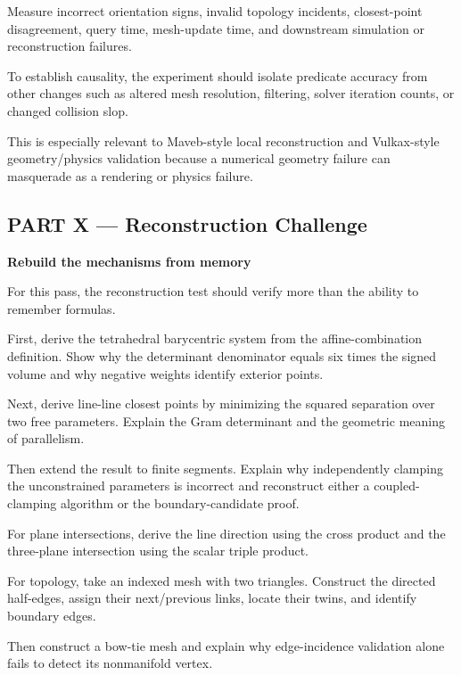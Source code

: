 Measure incorrect orientation signs, invalid topology incidents, closest-point disagreement, query time, mesh-update time, and downstream simulation or reconstruction failures.

To establish causality, the experiment should isolate predicate accuracy from other changes such as altered mesh resolution, filtering, solver iteration counts, or changed collision slop.

This is especially relevant to Maveb-style local reconstruction and Vulkax-style geometry/physics validation because a numerical geometry failure can masquerade as a rendering or physics failure.

\subsection{PART X --- Reconstruction Challenge}\label{04-visual-computing-ii-ch023-part-x-reconstruction-challenge}

\hypertarget{04-visual-computing-ii-ch023-part-x-reconstruction-challenge}{}

\textbf{Rebuild the mechanisms from memory}

For this pass, the reconstruction test should verify more than the ability to remember formulas.

First, derive the tetrahedral barycentric system from the affine-combination definition. Show why the determinant denominator equals six times the signed volume and why negative weights identify exterior points.

Next, derive line-line closest points by minimizing the squared separation over two free parameters. Explain the Gram determinant and the geometric meaning of parallelism.

Then extend the result to finite segments. Explain why independently clamping the unconstrained parameters is incorrect and reconstruct either a coupled-clamping algorithm or the boundary-candidate proof.

For plane intersections, derive the line direction using the cross product and the three-plane intersection using the scalar triple product.

For topology, take an indexed mesh with two triangles. Construct the directed half-edges, assign their next/previous links, locate their twins, and identify boundary edges.

Then construct a bow-tie mesh and explain why edge-incidence validation alone fails to detect its nonmanifold vertex.

